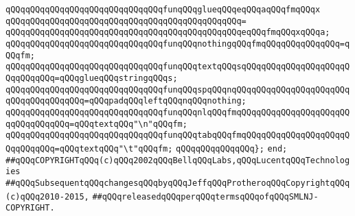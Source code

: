 \newline
\verb|qQQqqQQqqQQqqQQqqQQqqQQqqQQqqQQqfunqQQqglueqQQqeqQQqaqQQqfmqQQqx|\newline
\verb|qQQqqQQqqQQqqQQqqQQqqQQqqQQqqQQqqQQqqQQqqQQqqQQq=|\newline
\verb|qQQqqQQqqQQqqQQqqQQqqQQqqQQqqQQqqQQqqQQqqQQqqQQqeqQQqfmqQQqxqQQqa;|\newline
\newline
\verb|qQQqqQQqqQQqqQQqqQQqqQQqqQQqqQQqfunqQQqnothingqQQqfmqQQqqQQqqQQqqQQq=qQQqfm;|\newline
\verb|qQQqqQQqqQQqqQQqqQQqqQQqqQQqqQQqfunqQQqtextqQQqsqQQqqQQqqQQqqQQqqQQqqQQqqQQqqQQq=qQQqglueqQQqstringqQQqs;|\newline
\verb|qQQqqQQqqQQqqQQqqQQqqQQqqQQqqQQqfunqQQqspqQQqnqQQqqQQqqQQqqQQqqQQqqQQqqQQqqQQqqQQqqQQq=qQQqpadqQQqleftqQQqnqQQqnothing;|\newline
\newline
\verb|qQQqqQQqqQQqqQQqqQQqqQQqqQQqqQQqfunqQQqnlqQQqfmqQQqqQQqqQQqqQQqqQQqqQQqqQQqqQQqqQQq=qQQqtextqQQq"\n"qQQqfm;|\newline
\verb|qQQqqQQqqQQqqQQqqQQqqQQqqQQqqQQqfunqQQqtabqQQqfmqQQqqQQqqQQqqQQqqQQqqQQqqQQqqQQq=qQQqtextqQQq"\t"qQQqfm;|\newline
\verb|qQQqqQQqqQQqqQQq};|\newline
\verb|end;|\newline
\newline
\verb|##qQQqCOPYRIGHTqQQq(c)qQQq2002qQQqBellqQQqLabs,qQQqLucentqQQqTechnologies|\newline
\verb|##qQQqSubsequentqQQqchangesqQQqbyqQQqJeffqQQqProtheroqQQqCopyrightqQQq(c)qQQq2010-2015,|\newline
\verb|##qQQqreleasedqQQqperqQQqtermsqQQqofqQQqSMLNJ-COPYRIGHT.|\newline


